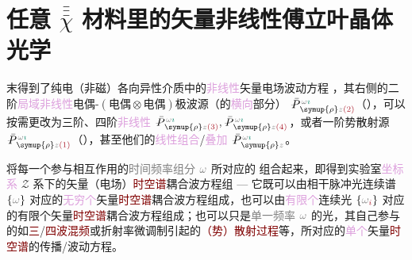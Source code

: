\chapter{任意 \texorpdfstring{$\bar{\bar{\bar{\chi}}}$}{$\bar{\bar{\bar{\text{χ}}}}$} 材料里的矢量非线性傅立叶晶体光学}\label{chap:NFCO}

 末得到了\textcolor{PineGreen}{纯电（非磁）各向异性}介质中的\textcolor{Plum}{非线性}矢量电场波动方程 ，其右侧的二阶\textcolor{Plum}{局域}\textcolor{Plum}{非线性}\textcolor{NavyBlue}{电偶-$(\text{电偶}\otimes\text{电偶})$}极\textcolor{NavyBlue}{波源}（的\textcolor{Plum}{横向}部分） $\Xint{\mathcolor{gray}{-}}{25}{\bar{P}}^{\;\! \mathcolor{gray}{\omega} \textcolor{PineGreen}{\imath}}_{\;\! \symup{\rho} \mathcolor{gray}{z} \textcolor{Maroon}{(2)}}$（），可以按需更改为三阶、四阶\textcolor{Plum}{非线性} $\Xint{\mathcolor{gray}{-}}{25}{\bar{P}}^{\;\! \mathcolor{gray}{\omega} \textcolor{PineGreen}{\imath}}_{\;\! \symup{\rho} \mathcolor{gray}{z} \textcolor{Maroon}{(3)}}, \Xint{\mathcolor{gray}{-}}{25}{\bar{P}}^{\;\! \mathcolor{gray}{\omega} \textcolor{PineGreen}{\imath}}_{\;\! \symup{\rho} \mathcolor{gray}{z} \textcolor{Maroon}{(4)}}$，或者一阶\textcolor{NavyBlue}{势散射}源 $\Xint{\mathcolor{gray}{-}}{25}{\bar{P}}^{\;\! \mathcolor{gray}{\omega} \textcolor{PineGreen}{\imath}}_{\;\! \symup{\rho} \mathcolor{gray}{z} \textcolor{Maroon}{(1)}}$（），甚至他们的\textcolor{Plum}{线性组合}/\textcolor{Plum}{叠加} $\Xint{\mathcolor{gray}{-}}{25}{\bar{P}}^{\;\! \mathcolor{gray}{\omega} \textcolor{PineGreen}{\imath}}_{\;\! \symup{\rho} \mathcolor{gray}{z}}$。

将每一个参与相互作用的\textcolor{gray}{时间频率组分} $\mathcolor{gray}{\omega}$ 所对应的  组合起来，即得到\textcolor{PineGreen}{实验室}\textcolor{Plum}{坐标系} \textcolor{PineGreen}{$\mathcal{Z}$ 系}下的矢量（电场）\textcolor{Maroon}{时空谱}耦合波方程组 --- 它既可以由相干\textcolor{NavyBlue}{脉冲光连续谱} $\{ \mathcolor{gray}{\omega} \}$ 对应的\textcolor{Plum}{无穷个}矢量\textcolor{Maroon}{时空谱}耦合波方程组成，也可以由\textcolor{Plum}{有限个}\textcolor{NavyBlue}{连续光} $\{ \mathcolor{gray}{\omega}_{\textcolor{Maroon}{i}} \}$ 对应的有限个矢量\textcolor{Maroon}{时空谱}耦合波方程组成；也可以只是\textcolor{gray}{单一频率} $\mathcolor{gray}{\omega}$ 的光，其自己参与的如\textcolor{Maroon}{三}/\textcolor{Maroon}{四波混频}或\textcolor{PineGreen}{折射率微调制}引起的\textcolor{Maroon}{（势）散射过程}等，所对应的\textcolor{Plum}{单个}矢量\textcolor{Maroon}{时空谱}的传播/波动方程。

